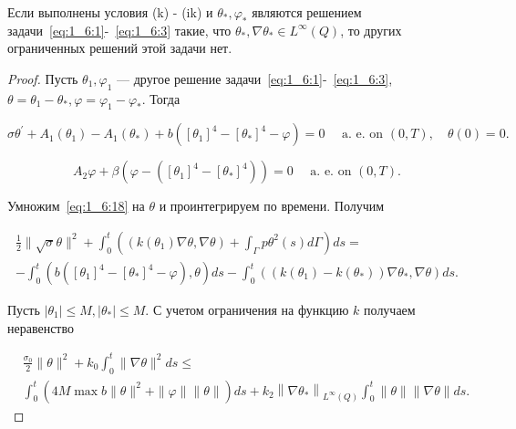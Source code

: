 \begin{theorem}
    \label{th:1_6:2}
    Если выполнены условия (k) - (ik) и $\theta_{*}, \varphi_{*}$ являются
    решением задачи~\eqref{eq:1_6:1}-~\eqref{eq:1_6:3}
    такие, что $\theta_{*}, \nabla \theta_{*} \in L^{\infty}(Q)$,
    то других ограниченных решений этой задачи нет.
\end{theorem}

\begin{proof}
    Пусть $\theta_{1}, \varphi_{1}$ — другое решение задачи~\eqref{eq:1_6:1}-~\eqref{eq:1_6:3},
    $\theta=\theta_{1}-\theta_{*}, \varphi=\varphi_{1}-\varphi_{*}$.
    Тогда

    \begin{equation}
        \label{eq:1_6:18}
        \sigma \theta^{\prime}+A_{1}\left(\theta_{1}\right)-A_{1}\left(\theta_{*}\right)
        +b\left(\left[\theta_{1}\right]^{4}-\left[\theta_{*}\right]^{4}-\varphi\right)
        =0 \quad \text { a. e. on }(0, T), \quad \theta(0)=0.
    \end{equation}


    \begin{equation}
        \label{eq:1_6:19}
        A_{2} \varphi+\beta\left(\varphi
        -\left(\left[\theta_{1}\right]^{4}
        -\left[\theta_{*}\right]^{4}\right)\right)
        =0 \quad \text { a. e. on }(0, T).
    \end{equation}

    Умножим~\eqref{eq:1_6:18} на $\theta$ и проинтегрируем по времени.
    Получим

    \[
        \begin{gathered}
            \frac{1}{2}\|\sqrt{\sigma} \theta\|^{2}
            +\int_{0}^{t}\left(\left(k\left(\theta_{1}\right) \nabla \theta,
            \nabla \theta\right)+\int_{\Gamma} p \theta^{2}(s) d \Gamma\right) ds= \\
            -\int_{0}^{t}\left(b\left(\left[\theta_{1}\right]^{4}
            -\left[\theta_{*}\right]^{4}-\varphi\right), \theta\right) ds
            -\int_{0}^{t}\left(\left(k\left(\theta_{1}\right)
            -k\left(\theta_{*}\right)\right) \nabla \theta_{*}, \nabla \theta\right) ds.
        \end{gathered}
    \]


    Пусть $\left|\theta_{1}\right| \leq M,\left|\theta_{*}\right| \leq M$.
    С учетом ограничения на функцию $k$ получаем неравенство

    \begin{equation}
        \label{eq:1_6:20}
        \begin{aligned}
            &\frac{\sigma_{0}}{2}\|\theta\|^{2}+k_{0} \int_{0}^{t}\|\nabla \theta\|^{2} d s \leq \\
            & \int_{0}^{t}\left(4 M \max b\|\theta\|^{2}+\|\varphi\|\|\theta\|\right) d s
            +k_{2}\left\|\nabla \theta_{*}\right\|_{L^{\infty}(Q)} \int_{0}^{t}\|\theta\|\|\nabla \theta\| d s.
        \end{aligned}
    \end{equation}


\end{proof}
